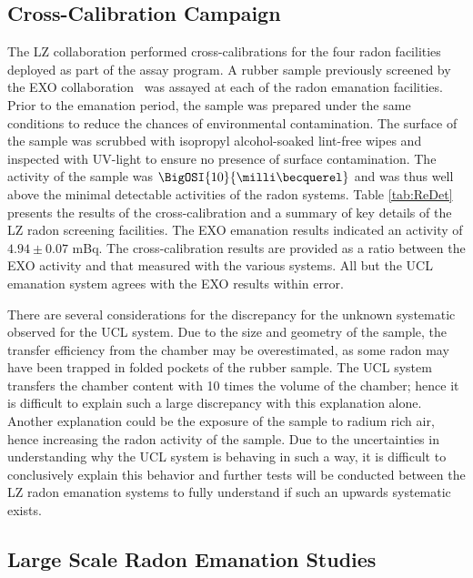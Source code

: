 \subsection{Cross-Calibration Campaign}
\label{secsec:cross_cal}

The LZ collaboration performed cross-calibrations for the four radon facilities deployed as part of the assay program. A rubber sample previously screened by the EXO collaboration~\cite{Albert:2015nta, Miller:2017tpl} was assayed at each of the radon emanation facilities. Prior to the emanation period, the sample was prepared under the same conditions to reduce the chances of environmental contamination. The surface of the sample was scrubbed with isopropyl alcohol-soaked lint-free wipes and inspected with UV-light to ensure no presence of surface contamination. The activity of the sample was $\BigOSI{10}{\mBq}$ and was thus well above the minimal detectable activities of the radon systems. Table \ref{tab:ReDet} presents the results of the cross-calibration and a summary of key details of the LZ radon screening facilities. The EXO emanation results indicated an activity of $4.94\pm0.07$ mBq. The cross-calibration results are provided as a ratio between the EXO activity and that measured with the various systems. All but the UCL emanation system agrees with the EXO results within error.
%

%

There are several considerations for the discrepancy for the unknown systematic observed for the UCL system. Due to the size and geometry of the sample, the transfer efficiency from the chamber may be overestimated, as some radon may have been trapped in folded pockets of the rubber sample. The UCL system transfers the chamber content with 10 times the volume of the chamber; hence it is difficult to explain such a large discrepancy with this explanation alone. Another explanation could be the exposure of the sample to radium rich air, hence increasing the radon activity of the sample. Due to the uncertainties in understanding why the UCL system is behaving in such a way, it is difficult to conclusively explain this behavior and further tests will be conducted between the LZ radon emanation systems to fully understand if such an upwards systematic exists. 


\subsection{Large Scale Radon Emanation Studies}
\label{secsec:large_scale_measurements}


